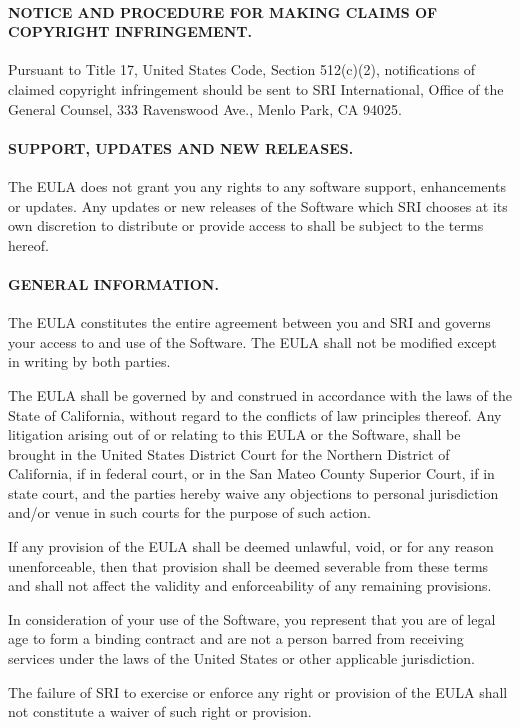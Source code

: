 \documentclass[11pt,twoside,fleqn,openright,titlepage]{cslreport}
\begin{document}
\begin{small}
\paragraph{NOTICE AND PROCEDURE FOR MAKING CLAIMS OF COPYRIGHT INFRINGEMENT.}
Pursuant   to  Title   17,  United   States  Code,   Section  512(c)(2),
notifications of claimed copyright  infringement should be sent to SRI
International,  Office of  the General  Counsel, 333  Ravenswood Ave.,
Menlo Park, CA 94025.


\paragraph{SUPPORT, UPDATES AND NEW RELEASES.}
The  EULA does  not  grant you  any  rights to  any software  support,
enhancements or updates.  Any updates  or new releases of the Software
which  SRI chooses  at its  own  discretion to  distribute or  provide
access to shall be subject to the terms hereof.


\paragraph{GENERAL INFORMATION.}
The  EULA constitutes  the entire  agreement between  you and  SRI and
governs your access to and use  of the Software. The EULA shall not be
modified except in writing by both parties.

The EULA  shall be  governed by and  construed in accordance  with the
laws of  the State of California,  without regard to  the conflicts of
law principles thereof.  Any litigation  arising out of or relating to
this  EULA or  the Software,  shall be  brought in  the  United States
District Court for the Northern  District of California, if in federal
court, or in  the San Mateo County Superior Court,  if in state court,
and the  parties hereby waive any objections  to personal jurisdiction
and/or venue in such courts for the purpose of such action.

If any  provision of the EULA  shall be deemed unlawful,  void, or for
any  reason  unenforceable,  then   that  provision  shall  be  deemed
severable  from these  terms and  shall  not affect  the validity  and
enforceability of any remaining provisions.

In consideration of  your use of the Software,  you represent that you
are  of legal age  to form  a binding  contract and  are not  a person
barred from receiving services under  the laws of the United States or
other applicable jurisdiction.

The failure  of SRI to exercise  or enforce any right  or provision of
the EULA shall not constitute a waiver of such right or provision.
\end{small}
\end{document}
